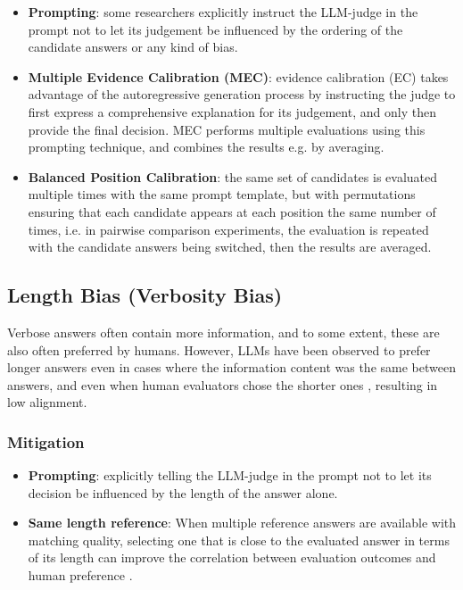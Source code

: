 \documentclass[noindent,nohyp,parspace,titlepage,twoside,12pt]{article}
\begin{document}
        \begin{itemize}
          \item \textbf{Prompting}: some researchers explicitly instruct the
                LLM-judge in the prompt not to let its judgement be influenced
                by the ordering of the candidate answers or any kind of bias.

          \item \textbf{Multiple Evidence Calibration (MEC)}: evidence
                calibration (EC) takes advantage of the autoregressive
                generation process by instructing the judge to first express a
                comprehensive explanation for its judgement, and only then
                provide the final decision. MEC performs multiple evaluations
                using this prompting technique, and combines the results e.g.
                by averaging.

          \item \textbf{Balanced Position Calibration}: the same set of
                candidates is evaluated multiple times with the same prompt
                template, but with permutations ensuring that each candidate
                appears at each position the same number of times, i.e. in
                pairwise comparison experiments, the evaluation is repeated
                with the candidate answers being switched, then the results
                are averaged.
        \end{itemize}

    \subsection{Length Bias (Verbosity Bias)}

      Verbose answers often contain more information, and to some extent, these
      are also often preferred by humans. However, LLMs have been observed to
      prefer longer answers even in cases where the information content was the
      same between answers, and even when human evaluators chose the shorter
      ones \cite{verbosity,syseval,biaslen}, resulting in low alignment.

      \subsubsection{Mitigation}

        \begin{itemize}
          \item \textbf{Prompting}: explicitly telling the LLM-judge in the
                prompt not to let its decision be influenced by the length of
                the answer alone.

          \item \textbf{Same length reference}: When multiple reference answers
                are available with matching quality, selecting one that is
                close to the evaluated answer in terms of its length can
                improve the correlation between evaluation outcomes and human
                preference \cite{biaslen}.
        \end{itemize}
\end{document}
